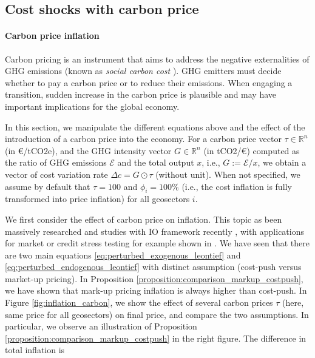 \documentclass{article}
\begin{document}
\subsection{Cost shocks with carbon price}

\paragraph{Carbon price inflation} Carbon pricing is an instrument that aims to address the negative externalities of GHG emissions (known as \textit{social carbon cost} \cite{change2014synthesis}). GHG emitters must decide whether to pay a carbon price or to reduce their emissions. When engaging a transition, sudden increase in the carbon price is plausible and may have important implications for the global economy. 

\vspace{0.1cm}

In this section, we manipulate the different equations above and the effect of the introduction of a carbon price into the economy. For a carbon price vector $\tau \in \mathbb{R}^n$ (in \euro/tCO2e), and the GHG intensity vector $G \in \mathbb{R}^n$ (in tCO2/\euro) computed as the ratio of GHG emissions $\mathcal{E}$ and the total output $x$, i.e., $G:=\mathcal{E}/x$, we obtain a vector of cost variation rate $\Delta c = G \odot \tau$ (without unit). When not specified, we assume by default that $\tau=100$ and $\phi_i=100\%$ (i.e., the cost inflation is fully transformed into price inflation) for all geosectors $i$. 

\vspace{0.1cm}

We first consider the effect of carbon price on inflation. This topic as been massively researched and studies with IO framework recently \cite{gemechu2014economic,mardones2020economic,cahen2021capital,roncalli2024economic}, with applications for market or credit stress testing for example shown in \cite{adenot2022cascading,desnos2023climate,pineau2024sectoral}.
We have seen that there are two main equations \eqref{eq:perturbed_exogenous_leontief} and \eqref{eq:perturbed_endogenous_leontief} with distinct assumption (cost-push versus market-up pricing). In Proposition \ref{proposition:comparison_markup_costpush}, we have shown that mark-up pricing inflation is always higher than cost-push. In Figure \ref{fig:inflation_carbon}, we show the effect of several carbon prices $\tau$ (here, same price for all geosectors) on final price, and compare the two assumptions. In particular, we observe an illustration of Proposition \ref{proposition:comparison_markup_costpush} in the right figure. The difference in total inflation is 
\end{document}
